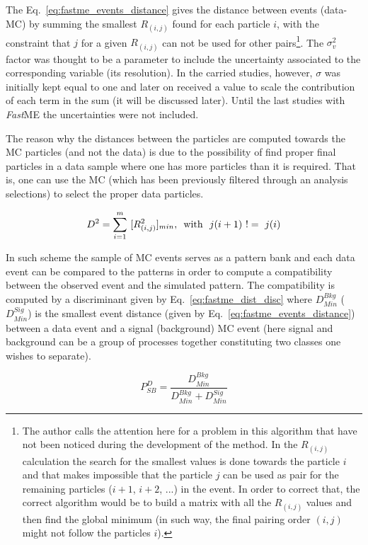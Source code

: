 The Eq.~\ref{eq:fastme_events_distance} gives the distance between events (data-MC) by summing the smallest $R_{(i,j)}$ found for each particle $i$, with the constraint that $j$ for a given $R_{(i,j)}$ can not be used for other pairs\footnote{The author calls the attention here for a problem in this algorithm that have not been noticed during the development of the method. In the $R_{(i,j)}$ calculation the search for the smallest values is done towards the particle $i$ and that makes impossible that the particle $j$ can be used as pair for the remaining particles ($i+1$, $i+2$, ...) in the event. In order to correct that, the correct algorithm would be to build a matrix with all the $R_{(i,j)}$ values and then find the global minimum (in such way, the final pairing order $(i,j)$ might not follow the particles $i$).}. The $\sigma_{v}^{2}$ factor was thought to be a parameter to include the uncertainty associated to the corresponding variable (its resolution). In the carried studies, however, $\sigma$ was initially kept equal to one and later on received a value to scale the contribution of each term in the sum (it will be discussed later). Until the last studies with \textit{Fast}ME the uncertainties were not included.

The reason why the distances between the particles are computed towards the MC particles (and not the data) is due to the possibility of find proper final particles in a data sample where one has more particles than it is required. That is, one can use the MC (which has been previously filtered through an analysis selections) to select the proper data particles.

\begin{equation}
	D^{2} = \sum_{i=1}^{m}~[R^{2}_{(i,j)}]_{min},~~$with$~~j(i+1) ~!=~j(i)
	\label{eq:fastme_events_distance}
\end{equation}

In such scheme the sample of MC events serves as a pattern bank and each data event can be compared to the patterns in order to compute a compatibility between the observed event and the simulated pattern. The compatibility is computed by a discriminant given by Eq.~\ref{eq:fastme_dist_disc} where $D^{Bkg}_{Min}$ ($D^{Sig}_{Min}$) is the smallest event distance (given by Eq.~\ref{eq:fastme_events_distance}) between a data event and a signal (background) MC event (here signal and background can be a group of processes together constituting two classes one wishes to separate). 

\begin{equation}
P_{SB}^{D} = \dfrac{D^{Bkg}_{Min}}{D^{Bkg}_{Min}+D^{Sig}_{Min}}
\label{eq:fastme_dist_disc}
\end{equation}

